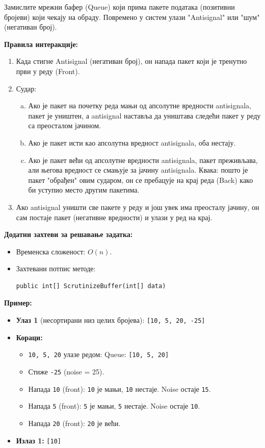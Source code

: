 Замислите мрежни бафер (Queue) који прима пакете података (позитивни бројеви) који чекају на обраду. Повремено у систем улази "Antisignal" или "шум" (негативан број).

\textbf{Правила интеракције:}
\begin{enumerate}
	\item Када стигне Antisignal (негативан број), он напада пакет који је тренутно први у реду (Front).
	\item Судар:
	\begin{enumerate}[a.]
		\item Ако је пакет на почетку реда мањи од апсолутне вредности antisignala, пакет је уништен, а antisignal наставља да уништава следећи пакет у реду са преосталом јачином.
		\item Ако је пакет исти као апсолутна вредност antisignala, оба нестају.
		\item Ако је пакет већи од апсолутне вредности antisignala, пакет преживљава, али његова вредност се смањује за јачину antisignala. Квака: пошто је пакет "обрађен" овим сударом, он се пребацује на крај реда (Back) како би уступио место другим пакетима.
	\end{enumerate}
	\item Ако antisignal уништи све пакете у реду и још увек има преосталу јачину, он сам постаје пакет (негативне вредности) и улази у ред на крај.
\end{enumerate}

\textbf{Додатни захтеви за решавање задатка:}
\begin{itemize}
	\item Временска сложеност: $O(n)$.
	\item Захтевани потпис методе:
	\begin{Verbatim}[fontsize=\small]
public int[] ScrutinizeBuffer(int[] data)
	\end{Verbatim}
\end{itemize}

\textbf{Пример:}
\begin{itemize}
	\item \textbf{Улаз 1} (несортирани низ целих бројева): \texttt{[10, 5, 20, -25]}
	\item \textbf{Кораци:}
	\begin{itemize}
		\item \texttt{10, 5, 20} улазе редом: Queue: \texttt{[10, 5, 20]}
		\item Стиже \texttt{-25} (noise = 25).
		\item Напада \texttt{10} (front): \texttt{10} је мањи, \texttt{10} нестаје. Noise остаје \texttt{15}.
		\item Напада \texttt{5} (front): \texttt{5} је мањи, \texttt{5} нестаје. Noise остаје \texttt{10}.
		\item Напада \texttt{20} (front): \texttt{20} је већи.
	\end{itemize}
	\item \textbf{Излаз 1:} \texttt{[10]}
\end{itemize}

